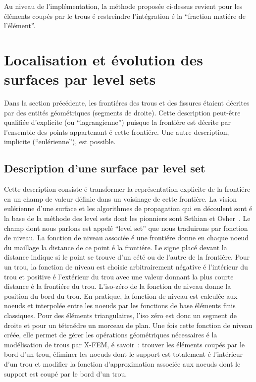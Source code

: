 

Au niveau de l'impl\'ementation, la m\'ethode
propos\'ee ci-dessus revient pour les
\'el\'ements coup\'es par le trous \'e
restreindre l'int\'egration
\'e la ``fraction mati\'ere de l'\'el\'ement''\cite{Daux:holes}.


\section{Localisation et \'evolution des surfaces par level sets}
\label{sec:local-et-evol}
Dans la section pr\'ec\'edente, les fronti\'eres des trous
et des fissures \'etaient d\'ecrites par des entit\'es g\'eom\'etriques
(segments de droite).
Cette description peut-\^etre qualifi\'ee d'explicite
(ou ``lagrangienne'') puisque
la fronti\'ere est d\'ecrite par l'ensemble des points appartenant
\'e cette fronti\'ere.
Une autre description, implicite (``eul\'erienne''), est possible.

\subsection{Description d'une surface par level set}

Cette description consiste \'e transformer la repr\'esentation explicite
de la fronti\'ere en un champ de valeur d\'efinie dans un voisinage de
cette fronti\'ere. La vision eul\'erienne d'une surface et les
algorithmes de propagation qui en d\'ecoulent sont \'e la base de la
m\'ethode des level sets dont les pionniers sont Sethian et
Osher~\cite{osher-sethian,Sethian:book}. Le champ dont nous parlons
est appel\'e ``level set'' que nous traduirons par fonction de niveau.
La fonction de niveau associ\'ee \'e une fronti\'ere donne en chaque noeud
du maillage la distance de ce point \'e la fronti\'ere. Le signe plac\'e
devant la distance indique si le point se trouve d'un c\'et\'e ou de
l'autre de la fronti\'ere. Pour un trou, la fonction de niveau est
choisie arbitrairement n\'egative \'e l'int\'erieur du trou et positive \'e
l'ext\'erieur du trou avec une valeur donnant la plus courte distance
\'e la fronti\'ere du trou. L'iso-z\'ero de la fonction de niveau donne la
position du bord du trou. En pratique, la fonction de niveau est
calcul\'ee aux noeuds et interpol\'ee entre les noeuds par les fonctions
de base \'el\'ements finis classiques. Pour des \'el\'ements triangulaires,
l'iso z\'ero est donc un segment de droite et pour un t\'etra\'edre un
morceau de plan. Une fois cette fonction de niveau cr\'e\'ee, elle
permet de g\'erer les op\'erations g\'eom\'etriques n\'ecessaires \'e la
mod\'elisation de trous par X-FEM, \'e savoir~: trouver les \'el\'ements
coup\'es par le bord d'un trou, \'eliminer les noeuds dont le support
est totalement \'e l'int\'erieur d'un trou et modifier la fonction
d'approximation associ\'ee aux noeuds dont le support est coup\'e par le
bord d'un trou.

